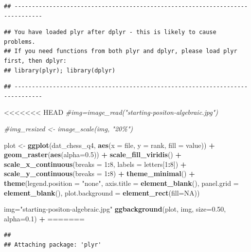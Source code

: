 \documentclass[
]{article}
\newcommand{\AttributeTok}[1]{\textcolor[rgb]{0.13,0.29,0.53}{#1}}
\newcommand{\CommentTok}[1]{\textcolor[rgb]{0.56,0.35,0.01}{\textit{#1}}}
\newcommand{\ConstantTok}[1]{\textcolor[rgb]{0.56,0.35,0.01}{#1}}
\newcommand{\DecValTok}[1]{\textcolor[rgb]{0.00,0.00,0.81}{#1}}
\newcommand{\FloatTok}[1]{\textcolor[rgb]{0.00,0.00,0.81}{#1}}
\newcommand{\FunctionTok}[1]{\textcolor[rgb]{0.13,0.29,0.53}{\textbf{#1}}}
\newcommand{\NormalTok}[1]{#1}
\newcommand{\OtherTok}[1]{\textcolor[rgb]{0.56,0.35,0.01}{#1}}
\newcommand{\SpecialCharTok}[1]{\textcolor[rgb]{0.81,0.36,0.00}{\textbf{#1}}}
\newcommand{\StringTok}[1]{\textcolor[rgb]{0.31,0.60,0.02}{#1}}
\begin{document}
\begin{verbatim}
## ------------------------------------------------------------------------------
\end{verbatim}

\begin{verbatim}
## You have loaded plyr after dplyr - this is likely to cause problems.
## If you need functions from both plyr and dplyr, please load plyr first, then dplyr:
## library(plyr); library(dplyr)
\end{verbatim}

\begin{verbatim}
## ------------------------------------------------------------------------------
\end{verbatim}

<<<<<<< HEAD
\CommentTok{\#img=image\_read("starting{-}positon{-}algebraic.jpg")}

\CommentTok{\#img\_resized \textless{}{-} image\_scale(img, "20\%")}

\NormalTok{plot }\OtherTok{\textless{}{-}} \FunctionTok{ggplot}\NormalTok{(dat\_chess\_q4, }\FunctionTok{aes}\NormalTok{(}\AttributeTok{x =}\NormalTok{ file, }\AttributeTok{y =}\NormalTok{ rank, }\AttributeTok{fill =}\NormalTok{ value)) }\SpecialCharTok{+}
  \FunctionTok{geom\_raster}\NormalTok{(}\FunctionTok{aes}\NormalTok{(}\AttributeTok{alpha=}\FloatTok{0.5}\NormalTok{)) }\SpecialCharTok{+}
  \FunctionTok{scale\_fill\_viridis}\NormalTok{() }\SpecialCharTok{+}
  \FunctionTok{scale\_x\_continuous}\NormalTok{(}\AttributeTok{breaks =} \DecValTok{1}\SpecialCharTok{:}\DecValTok{8}\NormalTok{, }\AttributeTok{labels =}\NormalTok{ letters[}\DecValTok{1}\SpecialCharTok{:}\DecValTok{8}\NormalTok{]) }\SpecialCharTok{+}
  \FunctionTok{scale\_y\_continuous}\NormalTok{(}\AttributeTok{breaks =} \DecValTok{1}\SpecialCharTok{:}\DecValTok{8}\NormalTok{) }\SpecialCharTok{+}
  \FunctionTok{theme\_minimal}\NormalTok{() }\SpecialCharTok{+}
  \FunctionTok{theme}\NormalTok{(}\AttributeTok{legend.position =} \StringTok{"none"}\NormalTok{,}
        \AttributeTok{axis.title =} \FunctionTok{element\_blank}\NormalTok{(),}
        \AttributeTok{panel.grid =} \FunctionTok{element\_blank}\NormalTok{(),}
        \AttributeTok{plot.background =} \FunctionTok{element\_rect}\NormalTok{(}\AttributeTok{fill=}\ConstantTok{NA}\NormalTok{))}

\NormalTok{img}\OtherTok{=}\StringTok{"starting{-}positon{-}algebraic.jpg"}
\FunctionTok{ggbackground}\NormalTok{(plot, img, }\AttributeTok{size=}\FloatTok{0.50}\NormalTok{, }\AttributeTok{alpha=}\FloatTok{0.1}\NormalTok{) }\SpecialCharTok{+}
=======
\begin{verbatim}
## 
## Attaching package: 'plyr'
\end{verbatim}
\end{document}
